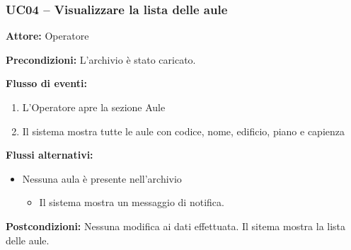 \documentclass[a4paper,11pt]{article}
\begin{document}
\begin{samepage}
\subsubsection*{UC04 -- Visualizzare la lista delle aule}
\begin{ucbox}

\noindent\textbf{Attore:} Operatore\par
\noindent\textbf{Precondizioni:} L'archivio è stato caricato.\par

\noindent\textbf{Flusso di eventi:}
\begin{enumerate}
\item L'Operatore apre la sezione Aule \item Il sistema mostra tutte le aule con codice, nome, edificio, piano e capienza \end{enumerate}
\noindent\textbf{Flussi alternativi:}
\begin{itemize}
\item[2a.] Nessuna aula è presente nell'archivio
\begin{itemize}
\item Il sistema mostra un messaggio di notifica.
\end{itemize}
\end{itemize}
\noindent\textbf{Postcondizioni:} Nessuna modifica ai dati effettuata. Il sitema mostra la lista delle aule.\par
\end{ucbox}
\end{samepage}
\end{document}
